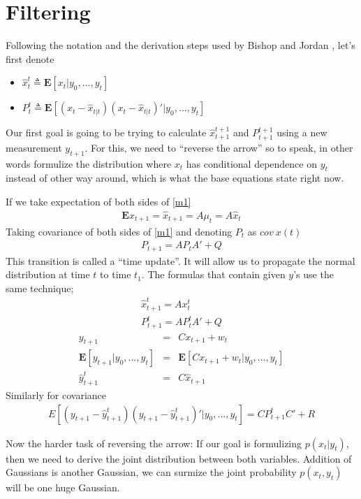 \section{Filtering}

Following the notation and the derivation steps used by Bishop and Jordan
\cite{jordan}, let's first denote

\begin{itemize}
   \item $\hat{x}_{t}^t \triangleq \mathbf{E}[x_t|y_0,...,y_t]$
   \item $P_{t}^t \triangleq \mathbf{E}[(x_t - \hat{x}_{t|t})(x_t -
   \hat{x}_{t|t})'|y_0,...,y_t]$ 
\end{itemize}
Our first goal is going to be trying to calculate $\hat{x}_{t+1}^{t+1}$ and
$P_{t+1}^{t+1}$ using a new measurement $y_{t+1}$. For this, we need to
``reverse the arrow'' so to speak, in other words formulize the distribution
where $x_t$ has conditional dependence on $y_t$ instead of other way around,
which is what the base equations state right now.

If we take expectation of both sides of \eqref{m1}
\begin{eqnarray*}
\mathbf{E}x_{t+1} = \hat{x}_{t+1} = A\mu_t = A\hat{x}_t
\end{eqnarray*}
Taking covariance of both sides of \eqref{m1} and denoting $P_t$ as $cov \: x(t)$
\begin{eqnarray*}
P_{t+1} = AP_{t}A' + Q
\end{eqnarray*}
This transition is called a ``time update''. It will allow us to propagate the
normal distribution at time $t$ to time $t_1$. The formulas that contain given
$y$'s use the same technique;
\begin{eqnarray*}
\hat{x}_{t+1}^t = Ax_{t}^t\\
P_{t+1}^t = AP_{t}^tA' + Q
\end{eqnarray*}
\begin{eqnarray*}
y_{t+1} &=& Cx_{t+1} + w_t\\
\mathbf{E}[y_{t+1}|y_0,...,y_t] &=& \mathbf{E}[Cx_{t+1}+w_t|y_0,...,y_t]\\
\hat{y}_{t+1}^t &=& C\hat{x}_{t+1}
\end{eqnarray*}
Similarly for covariance
\begin{eqnarray*}
E[(y_{t+1}-\hat{y}_{t+1}^t)(y_{t+1}-\hat{y}_{t+1}^t)'|y_0,...,y_t] =
CP_{t+1}^tC' + R
\end{eqnarray*}

Now the harder task of reversing the arrow: If our goal is formulizing
$p(x_t|y_t)$, then we need to derive the joint distribution between both
variables. Addition of Gaussians is another Gaussian, we can surmize the joint
probability $p(x_t,y_t)$ will be one huge Gaussian.

